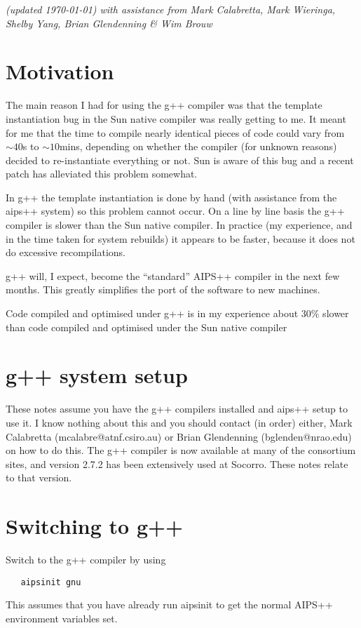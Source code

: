 \emph{(updated \today) with assistance from
  Mark Calabretta, Mark Wieringa, Shelby Yang, Brian Glendenning 
  \& Wim Brouw}

\section{Motivation}
The main reason I had for using the g++ compiler was that the template
instantiation bug in the Sun native compiler was really getting to me. It
meant for me that the time to compile nearly identical pieces of code could
vary from $\sim40$s to $\sim10$mins, depending on whether the compiler
(for unknown reasons) decided to re-instantiate everything or not. Sun is
aware of this bug and a recent patch has alleviated this problem somewhat.

In g++ the template instantiation is done by hand (with assistance from the
aips++ system) so this problem cannot occur. On a line by line basis the g++
compiler is slower than the Sun native compiler. In practice (my experience,
and in the time taken for system rebuilds) it appears to be faster,
because it does not do excessive recompilations.

g++ will, I expect, become the ``standard'' AIPS++ compiler in the next few
months.  This greatly simplifies the port of the software to new machines.

Code compiled and optimised under g++ is in my experience about 30\% slower
than code compiled and optimised under the Sun native compiler

\section{g++ system setup}
These notes assume you have the g++ compilers installed and aips++
setup to use it. I know nothing about this and you should contact (in
order) either, Mark Calabretta (mcalabre@atnf.csiro.au) or Brian
Glendenning (bglenden@nrao.edu) on how to do this. The g++ compiler is now
available at many of the consortium sites, and version 2.7.2 has been
extensively used at Socorro. These notes relate to that version.

\section{Switching to g++}
Switch to the g++ compiler by using
\begin{verbatim}
   aipsinit gnu
\end{verbatim}
   This assumes that you have already run aipsinit to get the normal AIPS++
   environment variables set. 

